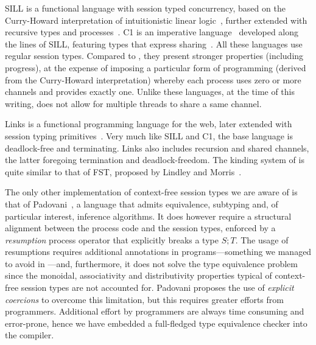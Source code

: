 SILL is a functional language with session typed concurrency, based on
the Curry-Howard interpretation of intuitionistic linear
logic~\cite{DBLP:conf/concur/CairesP10}, further extended with
recursive types and
processes~\cite{Toninho:phd,DBLP:conf/esop/ToninhoCP13}.
%
C1 is an imperative language~\cite{Pfenning:C1} developed along the
lines of SILL, featuring types that express
sharing~\cite{DBLP:journals/pacmpl/BalzerP17}.
%
All these languages use regular session types. Compared to \freest,
they present stronger properties (including progress), at the expense
of imposing a particular form of programming (derived from the
Curry-Howard interpretation) whereby each process uses zero or more
channels and provides exactly one. Unlike these languages, at the time
of this writing, \freest{} does not allow for multiple threads to
share a same channel.

Links is a functional programming language for the web, later extended
with session typing
primitives~\cite{DBLP:conf/fmco/CooperLWY06,DBLP:conf/esop/LindleyM15,Lindley.Morris_Lightweight.functional.session.types}. Very
much like SILL and C1, the base language is deadlock-free and
terminating. Links also includes recursion and shared channels, the
latter foregoing termination and deadlock-freedom.
%
The kinding system of \freest{} is quite similar to that of FST,
proposed by Lindley and
Morris~\cite{Lindley.Morris_Lightweight.functional.session.types}.

The only other implementation of context-free session types we are
aware of is that of Padovani~\cite{DBLP:conf/esop/Padovani17}, a
language that admits equivalence, subtyping and, of particular
interest, inference algorithms. It does however require a structural
alignment between the process code and the session types, enforced by
a \emph{resumption} process operator that explicitly breaks a type
$S;T$. The usage of resumptions requires additional annotations in
programs---something we managed to avoid in \freest---and,
furthermore, it does not solve the type equivalence problem since the
monoidal, associativity and distributivity properties typical of
context-free session types are not accounted for. Padovani proposes
the use of \emph{explicit coercions} to overcome this limitation, but
this requires greater efforts from programmers.  Additional effort by
programmers are always time consuming and error-prone, hence we have
embedded a full-fledged type equivalence checker into the compiler.

